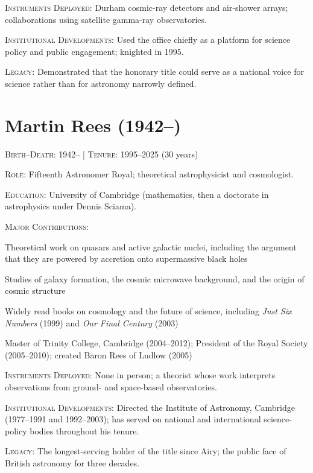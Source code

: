 \noindent\textsc{Instruments Deployed}: Durham cosmic-ray detectors and air-shower arrays; collaborations using satellite gamma-ray observatories.

\noindent\textsc{Institutional Developments}: Used the office chiefly as a platform for science policy and public engagement; knighted in 1995.

\noindent\textsc{Legacy}: Demonstrated that the honorary title could serve as a national voice for science rather than for astronomy narrowly defined.

\medskip

\section*{Martin Rees (1942--)}
\textsc{Birth--Death}: 1942-- | \textsc{Tenure}: 1995--2025 (30 years)

\noindent\textsc{Role}: Fifteenth Astronomer Royal; theoretical astrophysicist and cosmologist.

\noindent\textsc{Education}: University of Cambridge (mathematics, then a doctorate in astrophysics under Dennis Sciama).

\noindent\textsc{Major Contributions}:
\begin{enumerate*}[label=(\arabic*)]
\item Theoretical work on quasars and active galactic nuclei, including the argument that they are powered by accretion onto supermassive black holes
\item Studies of galaxy formation, the cosmic microwave background, and the origin of cosmic structure
\item Widely read books on cosmology and the future of science, including \emph{Just Six Numbers} (1999) and \emph{Our Final Century} (2003)
\item Master of Trinity College, Cambridge (2004--2012); President of the Royal Society (2005--2010); created Baron Rees of Ludlow (2005)
\end{enumerate*}

\noindent\textsc{Instruments Deployed}: None in person; a theorist whose work interprets observations from ground- and space-based observatories.

\noindent\textsc{Institutional Developments}: Directed the Institute of Astronomy, Cambridge (1977--1991 and 1992--2003); has served on national and international science-policy bodies throughout his tenure.

\noindent\textsc{Legacy}: The longest-serving holder of the title since Airy; the public face of British astronomy for three decades.

